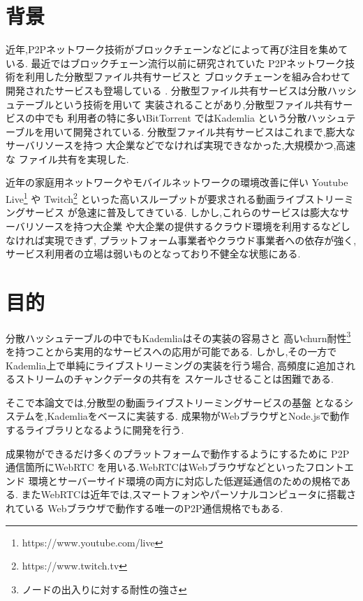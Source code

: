 \documentclass[sotsuron]{jcsie}
\begin{document}
\section{背景}
近年,P2Pネットワーク技術がブロックチェーンなどによって再び注目を集めている.
最近ではブロックチェーン流行以前に研究されていた
P2Pネットワーク技術を利用した分散型ファイル共有サービスと
ブロックチェーンを組み合わせて開発されたサービスも登場している
\cite{BitTorre1:online}.
分散型ファイル共有サービスは分散ハッシュテーブルという技術を用いて
実装されることがあり,分散型ファイル共有サービスの中でも
利用者の特に多いBitTorrent\cite{BitTorre59:online}
ではKademlia\cite{maymounkov2002kademlia}\cite{高野祐輝2010nat}
という分散ハッシュテーブルを用いて開発されている.
分散型ファイル共有サービスはこれまで,膨大なサーバリソースを持つ
大企業などでなければ実現できなかった,大規模かつ,高速な
ファイル共有を実現した.

近年の家庭用ネットワークやモバイルネットワークの環境改善に伴い
Youtube Live\footnote{https://www.youtube.com/live} や 
Twitch\footnote{https://www.twitch.tv} 
といった高いスループットが要求される動画ライブストリーミングサービス
が急速に普及してきている.
しかし,これらのサービスは膨大なサーバリソースを持つ大企業
や大企業の提供するクラウド環境を利用するなどしなければ実現できず,
プラットフォーム事業者やクラウド事業者への依存が強く,
サービス利用者の立場は弱いものとなっており不健全な状態にある.

\section{目的}
分散ハッシュテーブルの中でもKademliaはその実装の容易さと
高いchurn耐性\footnote{ノードの出入りに対する耐性の強さ}
を持つことから実用的なサービスへの応用が可能である.
しかし,その一方でKademlia上で単純にライブストリーミングの実装を行う場合,
高頻度に追加されるストリームのチャンクデータの共有を
スケールさせることは困難である.

そこで本論文では,分散型の動画ライブストリーミングサービスの基盤
となるシステムを,Kademliaをベースに実装する.
成果物がWebブラウザとNode.jsで動作するライブラリとなるように開発を行う.

成果物ができるだけ多くのプラットフォームで動作するようにするために
P2P通信箇所にWebRTC \cite{WebRTCHo80:online}
を用いる.WebRTCはWebブラウザなどといったフロントエンド
環境とサーバーサイド環境の両方に対応した低遅延通信のための規格である.
またWebRTCは近年では,スマートフォンやパーソナルコンピュータに搭載されている
Webブラウザで動作する唯一のP2P通信規格でもある.
\end{document}
